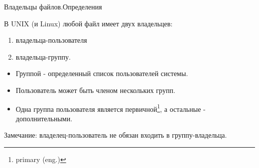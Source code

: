 \begin{frame}[fragile]{Владельцы файлов.Определения}

  В UNIX (и Linux) любой файл имеет двух владельцев:
  \begin{enumerate}
    \item владельца-пользователя
    \item владельца-группу.
  \end{enumerate} 
   
  \pause

  \begin{itemize}
    \item \alert{Группой} - определенный список пользователей системы.
    \item Пользователь может быть членом нескольких групп. 
    \item Одна группа пользователя является первичной\footnote{primary (eng.)}, а остальные - дополнительными.
  \end{itemize}
  \small{Замечание: владелец-пользователь не обязан входить в группу-владельца.}
   

\end{frame}
